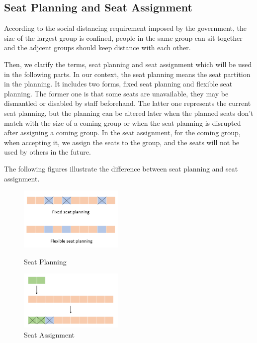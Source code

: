 \subsection{Seat Planning and Seat Assignment}
According to the social distancing requirement imposed by the government, the size of the largest group is confined, people in the same group can sit together and the adjcent groups should keep distance with each other.

Then, we clarify the terms, seat planning and seat assignment which will be used in the following parts. In our context, the seat planning means the seat partition in the planning. It includes two forms, fixed seat planning and flexible seat planning. The former one is that some seats are unavailable, they may be dismantled or disabled by staff beforehand. The latter one represents the current seat planning, but the planning can be altered later when the planned seats don't match with the size of a coming group or when the seat planning is disrupted after assigning a coming group. In the seat assignment, for the coming group, when accepting it, we assign the seats to the group, and the seats will not be used by others in the future.

The following figures illustrate the difference between seat planning and seat assignment.

\begin{figure}[htbp]
    \centering
    \begin{minipage}[t]{0.48\textwidth}
    \centering
    \includegraphics[width=5cm]{./Figures/seat_planning.png}
    \caption{Seat Planning}
    \end{minipage}
    \begin{minipage}[t]{0.48\textwidth}
    \centering
    \includegraphics[width=5cm]{./Figures/seat_assignment.png}
    \caption{Seat Assignment}
    \end{minipage}
\end{figure}

